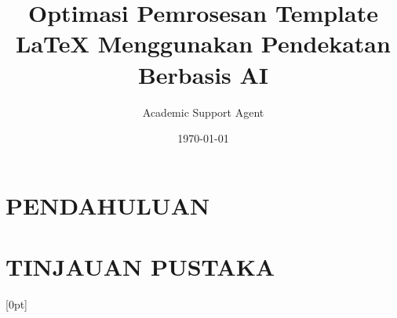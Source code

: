 \documentclass{article}
\title{Optimasi Pemrosesan Template LaTeX Menggunakan Pendekatan Berbasis AI}
\author{Academic Support Agent}
\date{\today}
\begin{document}
\maketitle

\begin{abstract}

\end{abstract}

\chapter{PENDAHULUAN}


\chapter{TINJAUAN PUSTAKA}


\usepackage[numbers]{gbt7714}
\usepackage{ctex} 
\usepackage{xeCJK}
\usepackage[hidelinks]{hyperref}
\usepackage[final]{pdfpages} 
\usepackage{natbib}
\usepackage{booktabs}
\usepackage{tabularx}
\usepackage{multirow}
\usepackage{graphicx}
\usepackage{amsmath}
\usepackage{geometry}
\geometry{left = 2.5cm, right = 2.5cm, top = 3cm, bottom = 3cm}
\usepackage{setspace}
\setlength{\baselineskip}{20pt}
\usepackage{fontspec}
\setmainfont{Times New Roman}
\usepackage{fancyhdr}
\usepackage{caption}

% 
\usepackage{titletoc}
\usepackage{amssymb}
\usepackage{siunitx}
\captionsetup{labelformat=default, labelsep=space, font=small}
\setlength{\belowcaptionskip}{12pt}

[0pt]{\addvspace{5pt}\filright}
{\contentspush{\thecontentslabel\ }}              
{}{\contentspage}
\usepackage{titlesec}
\renewcommand{\theequation}{\arabic{section}.\arabic{equation}}
\renewcommand{\thefigure}{\arabic{section}.\arabic{figure}}
\renewcommand{\thetable}{\arabic{section}.\arabic{table}}

\end{document}
